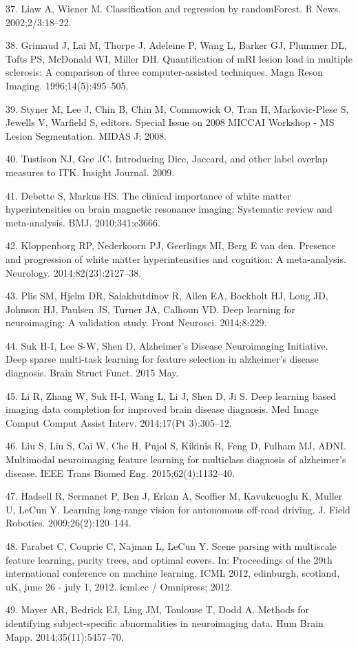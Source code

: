 \documentclass[11pt,]{article}
\begin{document}
\hypertarget{ref-liaw2002}{}
37. Liaw A, Wiener M. Classification and regression by randomForest. R
News. 2002;2/3:18--22.

\hypertarget{ref-Grimaud:1996aa}{}
38. Grimaud J, Lai M, Thorpe J, Adeleine P, Wang L, Barker GJ, Plummer
DL, Tofts PS, McDonald WI, Miller DH. Quantification of mRI lesion load
in multiple sclerosis: A comparison of three computer-assisted
techniques. Magn Reson Imaging. 1996;14(5):495--505.

\hypertarget{ref-styner2008}{}
39. Styner M, Lee J, Chin B, Chin M, Commowick O, Tran H, Markovic-Plese
S, Jewells V, Warfield S, editors. Special Issue on 2008 MICCAI Workshop
- MS Lesion Segmentation. MIDAS J; 2008.

\hypertarget{ref-tustison2009}{}
40. Tustison NJ, Gee JC. Introducing Dice, Jaccard, and other label
overlap measures to ITK. Insight Journal. 2009.

\hypertarget{ref-Debette:2010aa}{}
41. Debette S, Markus HS. The clinical importance of white matter
hyperintensities on brain magnetic resonance imaging: Systematic review
and meta-analysis. BMJ. 2010;341:c3666.

\hypertarget{ref-Kloppenborg:2014aa}{}
42. Kloppenborg RP, Nederkoorn PJ, Geerlings MI, Berg E van den.
Presence and progression of white matter hyperintensities and cognition:
A meta-analysis. Neurology. 2014;82(23):2127--38.

\hypertarget{ref-Plis:2014aa}{}
43. Plis SM, Hjelm DR, Salakhutdinov R, Allen EA, Bockholt HJ, Long JD,
Johnson HJ, Paulsen JS, Turner JA, Calhoun VD. Deep learning for
neuroimaging: A validation study. Front Neurosci. 2014;8:229.

\hypertarget{ref-Suk:2015aa}{}
44. Suk H-I, Lee S-W, Shen D, Alzheimer's Disease Neuroimaging
Initiative. Deep sparse multi-task learning for feature selection in
alzheimer's disease diagnosis. Brain Struct Funct. 2015 May.

\hypertarget{ref-Li:2014aa}{}
45. Li R, Zhang W, Suk H-I, Wang L, Li J, Shen D, Ji S. Deep learning
based imaging data completion for improved brain disease diagnosis. Med
Image Comput Comput Assist Interv. 2014;17(Pt 3):305--12.

\hypertarget{ref-Liu:2015aa}{}
46. Liu S, Liu S, Cai W, Che H, Pujol S, Kikinis R, Feng D, Fulham MJ,
ADNI. Multimodal neuroimaging feature learning for multiclass diagnosis
of alzheimer's disease. IEEE Trans Biomed Eng. 2015;62(4):1132--40.

\hypertarget{ref-HadsellSBESKML09}{}
47. Hadsell R, Sermanet P, Ben J, Erkan A, Scoffier M, Kavukcuoglu K,
Muller U, LeCun Y. Learning long-range vision for autonomous off-road
driving. J. Field Robotics. 2009;26(2):120--144.

\hypertarget{ref-FarabetCNL12}{}
48. Farabet C, Couprie C, Najman L, LeCun Y. Scene parsing with
multiscale feature learning, purity trees, and optimal covers. In:
Proceedings of the 29th international conference on machine learning,
ICML 2012, edinburgh, scotland, uK, june 26 - july 1, 2012. icml.cc /
Omnipress; 2012.

\hypertarget{ref-Mayer:2014aa}{}
49. Mayer AR, Bedrick EJ, Ling JM, Toulouse T, Dodd A. Methods for
identifying subject-specific abnormalities in neuroimaging data. Hum
Brain Mapp. 2014;35(11):5457--70.
\end{document}
